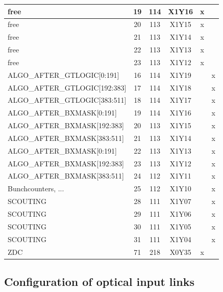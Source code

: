 \begin{longtable}{|l|c|c|c|c|c|}
free & 19  & 114 & X1Y16 & x &   \\\hline
free & 20  & 113 & X1Y15 & x &   \\\hline
free & 21  & 113 & X1Y14 & x &   \\\hline
free & 22  & 113 & X1Y13 & x &   \\\hline
free & 23  & 113 & X1Y12 & x &   \\\hline\hline
ALGO\_AFTER\_GTLOGIC[0:191] & 16  & 114 & X1Y19 &   & x \\\hline
ALGO\_AFTER\_GTLOGIC[192:383] & 17  & 114 & X1Y18 &   & x \\\hline
ALGO\_AFTER\_GTLOGIC[383:511] & 18  & 114 & X1Y17 &   & x \\\hline
ALGO\_AFTER\_BXMASK[0:191] & 19  & 114 & X1Y16 &   & x \\\hline
ALGO\_AFTER\_BXMASK[192:383] & 20  & 113 & X1Y15 &   & x \\\hline
ALGO\_AFTER\_BXMASK[383:511] & 21  & 113 & X1Y14 &   & x \\\hline
ALGO\_AFTER\_BXMASK[0:191] & 22  & 113 & X1Y13 &   & x \\\hline
ALGO\_AFTER\_BXMASK[192:383] & 23  & 113 & X1Y12 &   & x \\\hline
ALGO\_AFTER\_BXMASK[383:511] & 24  & 112 & X1Y11 &   & x \\\hline
Bunchcounters, ... & 25  & 112 & X1Y10 &   & x \\\hline
SCOUTING & 28  & 111 & X1Y07 &   & x \\\hline
SCOUTING & 29  & 111 & X1Y06 &   & x \\\hline
SCOUTING & 30  & 111 & X1Y05 &   & x \\\hline
SCOUTING & 31  & 111 & X1Y04 &   & x \\\hline\hline
ZDC & 71  & 218 & X0Y35 & x & \\\hline
\end{longtable}

\clearpage

\subsection{Configuration of optical input links}\label{sec:app:app_b}

% 
% 


